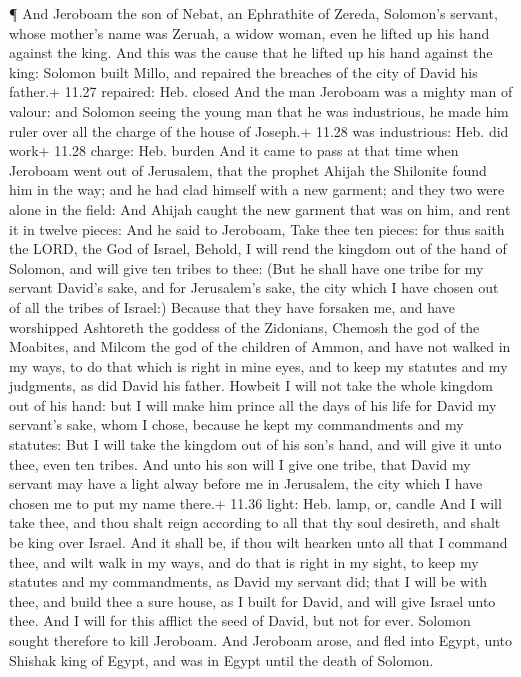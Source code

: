  ¶ And Jeroboam the son of Nebat, an Ephrathite of Zereda,
Solomon's servant, whose mother's name was Zeruah, a widow woman, even
he lifted up his hand against the king.  And this was the
cause that he lifted up his hand against the king: Solomon built Millo,
and repaired the breaches of the city of David his father.+ 11.27
repaired: Heb. closed  And the man Jeroboam was a mighty
man of valour: and Solomon seeing the young man that he was industrious,
he made him ruler over all the charge of the house of Joseph.+ 11.28 was
industrious: Heb. did work+ 11.28 charge: Heb. burden  And
it came to pass at that time when Jeroboam went out of Jerusalem, that
the prophet Ahijah the Shilonite found him in the way; and he had clad
himself with a new garment; and they two were alone in the field:
 And Ahijah caught the new garment that was on him, and
rent it in twelve pieces:  And he said to Jeroboam, Take
thee ten pieces: for thus saith the LORD, the God of Israel, Behold, I
will rend the kingdom out of the hand of Solomon, and will give ten
tribes to thee:  (But he shall have one tribe for my
servant David's sake, and for Jerusalem's sake, the city which I have
chosen out of all the tribes of Israel:)  Because that they
have forsaken me, and have worshipped Ashtoreth the goddess of the
Zidonians, Chemosh the god of the Moabites, and Milcom the god of the
children of Ammon, and have not walked in my ways, to do that which is
right in mine eyes, and to keep my statutes and my judgments, as did
David his father.  Howbeit I will not take the whole
kingdom out of his hand: but I will make him prince all the days of his
life for David my servant's sake, whom I chose, because he kept my
commandments and my statutes:  But I will take the kingdom
out of his son's hand, and will give it unto thee, even ten tribes.
 And unto his son will I give one tribe, that David my
servant may have a light alway before me in Jerusalem, the city which I
have chosen me to put my name there.+ 11.36 light: Heb. lamp, or, candle
 And I will take thee, and thou shalt reign according to
all that thy soul desireth, and shalt be king over Israel. 
And it shall be, if thou wilt hearken unto all that I command thee, and
wilt walk in my ways, and do that is right in my sight, to keep my
statutes and my commandments, as David my servant did; that I will be
with thee, and build thee a sure house, as I built for David, and will
give Israel unto thee.  And I will for this afflict the
seed of David, but not for ever.  Solomon sought therefore
to kill Jeroboam. And Jeroboam arose, and fled into Egypt, unto Shishak
king of Egypt, and was in Egypt until the death of Solomon.

